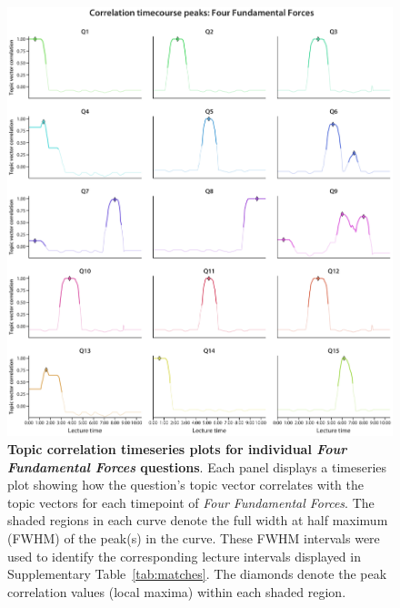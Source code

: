 \documentclass[10pt]{article}
\begin{document}
\begin{figure}[tp]
    \centering
    \includegraphics[width=\textwidth]{figs/forces-qcorrs-peaks}

    \caption{\textbf{Topic correlation timeseries plots for individual
    \textit{Four Fundamental Forces} questions}. Each panel displays a
    timeseries plot showing how the question's topic vector correlates with the
    topic vectors for each timepoint of \textit{Four Fundamental Forces}. The
    shaded regions in each curve denote the full width at half maximum (FWHM)
    of the peak(s) in the curve. These FWHM intervals were used to identify the
    corresponding lecture intervals displayed in Supplementary
    Table~\ref{tab:matches}. The diamonds denote the peak correlation values
    (local maxima) within each shaded region.}
    \label{fig:forces-peaks}
\end{figure}
\end{document}
